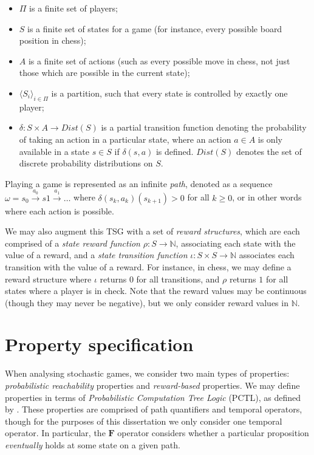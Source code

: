 \begin{itemize}
    \item $\Pi$ is a finite set of players;
    \item $S$ is a finite set of states for a game (for instance, every possible board position in chess);
    \item $A$ is a finite set of actions (such as every possible move in chess, not just those which are possible in the current state);
    \item $\langle S_i \rangle_{i \in \Pi}$ is a partition, such that every state is controlled by exactly one player;
    \item $\delta : S \times A \rightarrow Dist(S)$ is a partial transition function denoting the probability of taking an action in a particular state, where an action $a \in A$ is only available in a state $s \in S$ if $\delta(s, a)$ is defined. $Dist(S)$ denotes the set of discrete probability distributions on $S$.
\end{itemize}

Playing a game is represented as an infinite \emph{path}, denoted as a sequence $\omega = s_0 \xrightarrow{a_0} s1 \xrightarrow{a_1} \dots$ where $\delta(s_k, a_k)(s_{k+1})>0$ for all $k\geq0$, or in other words where each action is possible.

We may also augment this TSG with a set of \emph{reward structures}, which are each comprised of a \emph{state reward function} $\rho : S \rightarrow \mathbb{N}$, associating each state with the value of a reward, and a \emph{state transition function} $\iota : S \times S \rightarrow \mathbb{N}$ associates each transition with the value of a reward. For instance, in chess, we may define a reward structure where $\iota$ returns $0$ for all transitions, and $\rho$ returns $1$ for all states where a player is in check. Note that the reward values may be continuous (though they may never be negative), but we only consider reward values in $\mathbb{N}$.

\section{Property specification}

When analysing stochastic games, we consider two main types of properties: \emph{probabilistic reachability} properties and \emph{reward-based} properties. We may define properties in terms of \emph{Probabilistic Computation Tree Logic} (PCTL), as defined by \cite{hansson_logic_1994}. These properties are comprised of path quantifiers and temporal operators, though for the purposes of this dissertation we only consider one temporal operator. In particular, the $\mathbf{F}$ operator considers whether a particular proposition \emph{eventually} holds at some state on a given path.

